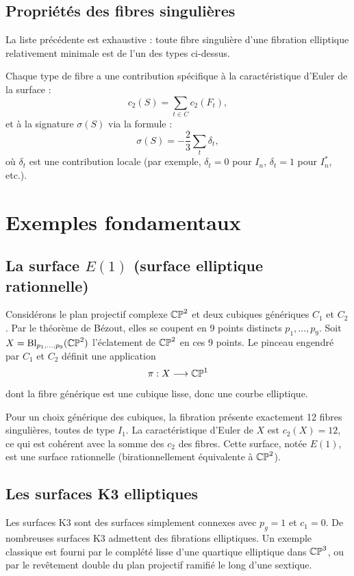 \subsection{Propriétés des fibres singulières}

\begin{theoreme}
La liste précédente est exhaustive : toute fibre singulière d'une fibration elliptique relativement minimale est de l'un des types ci-dessus.
\end{theoreme}

Chaque type de fibre a une contribution spécifique à la caractéristique d'Euler de la surface :
\[
c_2(S) = \sum_{t \in C} c_2(F_t),
\]
et à la signature $\sigma(S)$ via la formule :
\[
\sigma(S) = -\frac{2}{3} \sum_t \delta_t,
\]
où $\delta_t$ est une contribution locale (par exemple, $\delta_t = 0$ pour $I_n$, $\delta_t = 1$ pour $I_n^*$, etc.).

\section{Exemples fondamentaux}

\subsection{La surface $E(1)$ (surface elliptique rationnelle)}

Considérons le plan projectif complexe $\mathbb{CP}^2$ et deux cubiques génériques $C_1$ et $C_2$. Par le théorème de Bézout, elles se coupent en 9 points distincts $p_1, \dots, p_9$. Soit $X = \operatorname{Bl}_{p_1, \dots, p_9}(\mathbb{CP}^2)$ l'éclatement de $\mathbb{CP}^2$ en ces 9 points. Le pinceau engendré par $C_1$ et $C_2$ définit une application
\[
\pi: X \longrightarrow \mathbb{CP}^1
\]
dont la fibre générique est une cubique lisse, donc une courbe elliptique.

Pour un choix générique des cubiques, la fibration présente exactement 12 fibres singulières, toutes de type $I_1$. La caractéristique d'Euler de $X$ est $c_2(X) = 12$, ce qui est cohérent avec la somme des $c_2$ des fibres. Cette surface, notée $E(1)$, est une surface rationnelle (birationnellement équivalente à $\mathbb{CP}^2$).

\subsection{Les surfaces K3 elliptiques}

Les surfaces K3 sont des surfaces simplement connexes avec $p_g = 1$ et $c_1 = 0$. De nombreuses surfaces K3 admettent des fibrations elliptiques. Un exemple classique est fourni par le complété lisse d'une quartique elliptique dans $\mathbb{CP}^3$, ou par le revêtement double du plan projectif ramifié le long d'une sextique.

